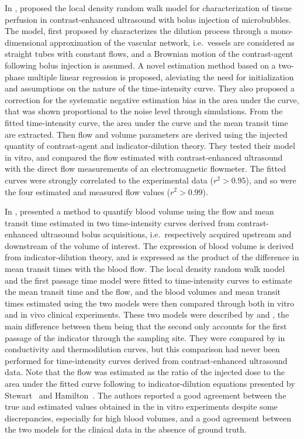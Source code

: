 In \citeyear{Mischi:2003ed}, \citet{Mischi:2003ed} proposed the local density random walk model for characterization of tissue perfusion in contrast-enhanced ultrasound with bolus injection of microbubbles. 
The model, first proposed by \citet{Sheppard:1951we} characterizes the dilution process through a mono-dimensional approximation of the vascular network, i.e.~vessels are considered as straight tubes with constant flows, and a Brownian motion of the contrast-agent following bolus injection is assumed.
A novel estimation method based on a two-phase multiple linear regression is proposed, aleviating the need for initialization and assumptions on the nature of the time-intensity curve.
They also proposed a correction for the systematic negative estimation bias in the area under the curve, that was shown proportional to the noise level through simulations.
From the fitted time-intensity curve, the area under the curve and the mean transit time are extracted.
Then flow and volume parameters are derived using the injected quantity of contrast-agent and indicator-dilution theory.
They tested their model in vitro, and compared the flow estimated with contrast-enhanced ultrasound with the direct flow measurements of an electromagnetic flowmeter.
The fitted curves were strongly correlated to the experimental data ($r^2 \gt 0.95$), and so were the four estimated and measured flow values ($r^2 \gt 0.99$).

In \citeyear{Mischi:2004cn}, \citet{Mischi:2004cn} presented a method to quantify blood volume using the flow and mean transit time estimated in two time-intensity curves derived from contrast-enhanced ultrasound bolus acquisitions, i.e.~respectively acquired upstream and downstream of the volume of interest.
The expression of blood volume is derived from indicator-dilution theory, and is expressed as the product of the difference in mean transit times with the blood flow.
The local density random walk model and the first passage time model were fitted to time-intensity curves to estimate the mean transit time and the flow, and the blood volumes and mean transit times estimated using the two models were then compared through both in vitro and in vivo clinical experiments.
These two models were described by \citet{Walley:1964fr} and \citet{Wise:1966wy}, the main difference between them being that the second only accounts for the first passage of the indicator through the sampling site.
They were compared by \citet{Bogaard:1986wp} in conductivity and thermodilution curves, but this comparison had never been performed for time-intensity curves derived from contrast-enhanced ultrasound data.
Note that the flow was estimated as the ratio of the injected dose to the area under the fitted curve following to indicator-dilution equations presented by Stewart~\cite{Stewart:1897dz} and Hamilton~\cite{Hamilton:1932ww}.
The authors reported a good agreement between the true and estimated values obtained in the in vitro experiments despite some discrepancies, especially for high blood volumes, and a good agreement between the two models for the clinical data in the absence of ground truth.

